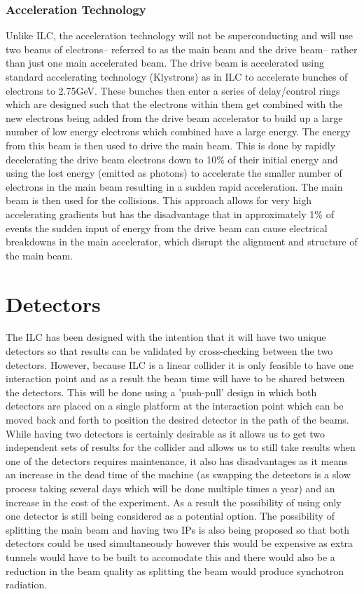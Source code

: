 \subsection{Acceleration Technology}
Unlike \ac{ILC}, the acceleration technology will not be superconducting and will use two beams of electrons-- referred to as the main beam and the drive beam-- rather than just one main accelerated beam. The drive beam is accelerated using standard accelerating technology (Klystrons) as in \ac{ILC} to accelerate bunches of electrons to 2.75GeV. These bunches then enter a series of delay/control rings which are designed such that the electrons within them get combined with the new electrons being added from the drive beam accelerator to build up a large number of low energy electrons which combined have a large energy. The energy from this beam is then used to drive the main beam. This is done by rapidly decelerating the drive beam electrons down to 10\% of their initial energy and using the lost energy (emitted as photons) to accelerate the smaller number of electrons in the main beam resulting in a sudden rapid acceleration. The main beam is then used for the collisions. This approach allows for very high accelerating gradients but has the disadvantage that in approximately 1\% of events the sudden input of energy from the drive beam can cause electrical breakdowns in the main accelerator, which disrupt the alignment and structure of the main beam.

\chapter{Detectors}
The \ac{ILC} has been designed with the intention that it will have two unique detectors so that results can be validated by cross-checking between the two detectors. However, because \ac{ILC} is a linear collider it is only feasible to have one interaction point and as a result the beam time will have to be shared between the detectors. This will be done using a 'push-pull' design in which both detectors are placed on a single platform at the interaction point which can be moved back and forth to position the desired detector in the path of the beams. While having two detectors is certainly desirable as it allows us to get two independent sets of results for the collider and allows us to still take results when one of the detectors requires maintenance, it also has disadvantages as it means an increase in the dead time of the machine (as swapping the detectors is a slow process taking several days which will be done multiple times a year) and an increase in the cost of the experiment. As a result the possibility of using only one detector is still being considered as a potential option. The possibility of splitting the main beam and having two IPs is also being proposed so that both detectors could be used simultaneously however this would be expensive as extra tunnels would have to be built to accomodate this and there would also be a reduction in the beam quality as splitting the beam would produce synchotron radiation.
